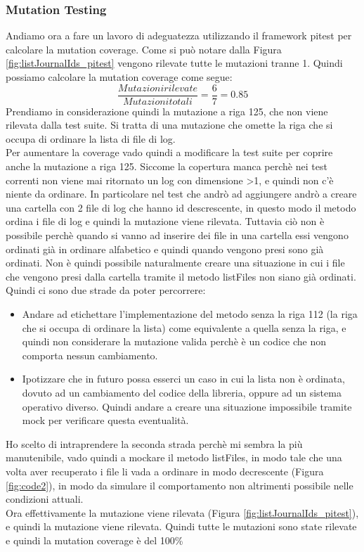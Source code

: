 \documentclass[12pt, a4paper]{article}
\begin{document}
\subsubsection{Mutation Testing}
Andiamo ora a fare un lavoro di adeguatezza utilizzando il framework pitest per calcolare la mutation coverage. 
Come si può notare dalla Figura \ref{fig:listJournalIds_pitest} vengono rilevate tutte le mutazioni tranne 1.
Quindi possiamo calcolare la mutation coverage come segue:
\[\frac{{Mutazioni rilevate}}{{Mutazioni totali}} = \frac{{6}}{{7}} = 0.85\]
Prendiamo in considerazione quindi la mutazione a riga 125, che non viene rilevata dalla test suite. Si tratta 
di una mutazione che omette la riga che si occupa di ordinare la lista di file di log. \\

Per aumentare la coverage vado quindi a modificare la test suite per coprire anche la mutazione a riga 125.
Siccome la copertura manca perchè nei test correnti non viene mai ritornato un log con dimensione \textgreater1, e 
quindi non c'è niente da ordinare. In particolare nel test che andrò ad aggiungere andrò a creare una cartella con 2 file
di log che hanno id descrescente, in questo modo il metodo ordina i file di log e quindi la mutazione viene rilevata.
Tuttavia ciò non è possibile perchè quando si vanno ad inserire dei file in una cartella essi vengono ordinati già in ordinare
alfabetico e quindi quando vengono presi sono già ordinati. Non è quindi possibile naturalmente creare una situazione 
in cui i file che vengono presi dalla cartella tramite il metodo listFiles\(\) non siano già ordinati. \\
Quindi ci sono due strade da poter percorrere:
\begin{itemize}
  \item Andare ad etichettare l'implementazione del metodo senza la riga 112 (la riga che si occupa di ordinare la lista) 
  come equivalente a quella senza la riga, e quindi non considerare la mutazione valida perchè è un codice che non
  comporta nessun cambiamento.
  \item Ipotizzare che in futuro possa esserci un caso in cui la lista non è ordinata, dovuto ad un cambiamento del codice
  della libreria, oppure ad un sistema operativo diverso. Quindi andare a creare una situazione impossibile tramite mock per
  verificare questa eventualità.
\end{itemize} 
Ho scelto di intraprendere la seconda strada perchè mi sembra la più manutenibile, vado quindi a mockare 
il metodo listFiles\(\), in modo tale che una volta aver recuperato i file li vada a 
ordinare in modo decrescente (Figura \ref{fig:code2}), in modo da simulare il comportamento non altrimenti possibile nelle condizioni attuali. \\
Ora effettivamente la mutazione viene rilevata (Figura \ref{fig:listJournalIds_pitest}), e quindi la mutazione viene rilevata.
Quindi tutte le mutazioni sono state rilevate e quindi la mutation coverage è del 100\% 
\end{document}
